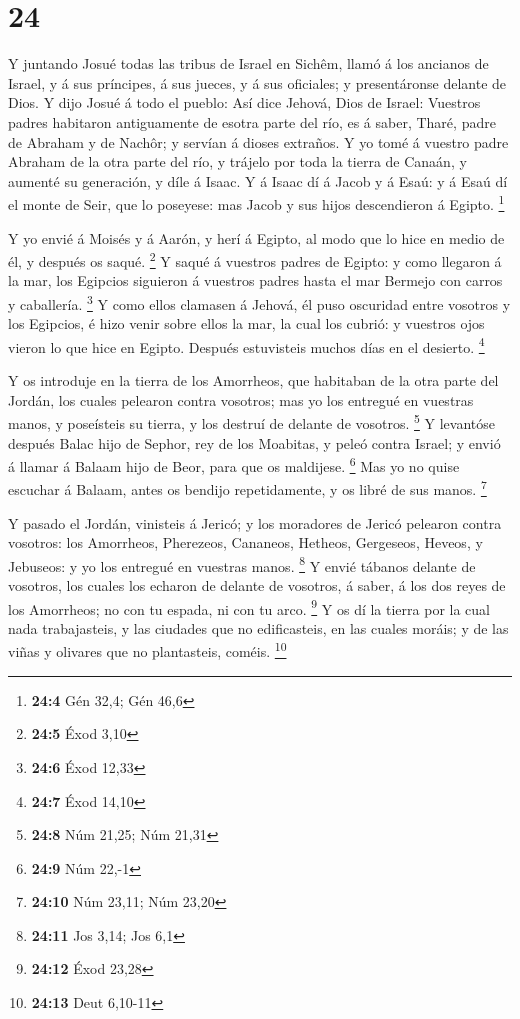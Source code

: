 \hypertarget{section-23}{%
\section{24}\label{section-23}}

 Y juntando Josué todas las tribus de Israel en Sichêm,
llamó á los ancianos de Israel, y á sus príncipes, á sus jueces, y á sus
oficiales; y presentáronse delante de Dios.  Y dijo Josué á
todo el pueblo: Así dice Jehová, Dios de Israel: Vuestros padres
habitaron antiguamente de esotra parte del río, es á saber, Tharé, padre
de Abraham y de Nachôr; y servían á dioses extraños.  Y yo
tomé á vuestro padre Abraham de la otra parte del río, y trájelo por
toda la tierra de Canaán, y aumenté su generación, y díle á Isaac.
 Y á Isaac dí á Jacob y á Esaú: y á Esaú dí el monte de
Seir, que lo poseyese: mas Jacob y sus hijos descendieron á Egipto.
\footnote{\textbf{24:4} Gén 32,4; Gén 46,6}

 Y yo envié á Moisés y á Aarón, y herí á Egipto, al modo que
lo hice en medio de él, y después os saqué. \footnote{\textbf{24:5} Éxod
  3,10}  Y saqué á vuestros padres de Egipto: y como
llegaron á la mar, los Egipcios siguieron á vuestros padres hasta el mar
Bermejo con carros y caballería. \footnote{\textbf{24:6} Éxod 12,33}
 Y como ellos clamasen á Jehová, él puso oscuridad entre
vosotros y los Egipcios, é hizo venir sobre ellos la mar, la cual los
cubrió: y vuestros ojos vieron lo que hice en Egipto. Después
estuvisteis muchos días en el desierto. \footnote{\textbf{24:7} Éxod
  14,10}

 Y os introduje en la tierra de los Amorrheos, que habitaban
de la otra parte del Jordán, los cuales pelearon contra vosotros; mas yo
los entregué en vuestras manos, y poseísteis su tierra, y los destruí de
delante de vosotros. \footnote{\textbf{24:8} Núm 21,25; Núm 21,31}
 Y levantóse después Balac hijo de Sephor, rey de los
Moabitas, y peleó contra Israel; y envió á llamar á Balaam hijo de Beor,
para que os maldijese. \footnote{\textbf{24:9} Núm 22,-1} 
Mas yo no quise escuchar á Balaam, antes os bendijo repetidamente, y os
libré de sus manos. \footnote{\textbf{24:10} Núm 23,11; Núm 23,20}

 Y pasado el Jordán, vinisteis á Jericó; y los moradores de
Jericó pelearon contra vosotros: los Amorrheos, Pherezeos, Cananeos,
Hetheos, Gergeseos, Heveos, y Jebuseos: y yo los entregué en vuestras
manos. \footnote{\textbf{24:11} Jos 3,14; Jos 6,1}  Y envié
tábanos delante de vosotros, los cuales los echaron de delante de
vosotros, á saber, á los dos reyes de los Amorrheos; no con tu espada,
ni con tu arco. \footnote{\textbf{24:12} Éxod 23,28}  Y os
dí la tierra por la cual nada trabajasteis, y las ciudades que no
edificasteis, en las cuales moráis; y de las viñas y olivares que no
plantasteis, coméis. \footnote{\textbf{24:13} Deut 6,10-11}

